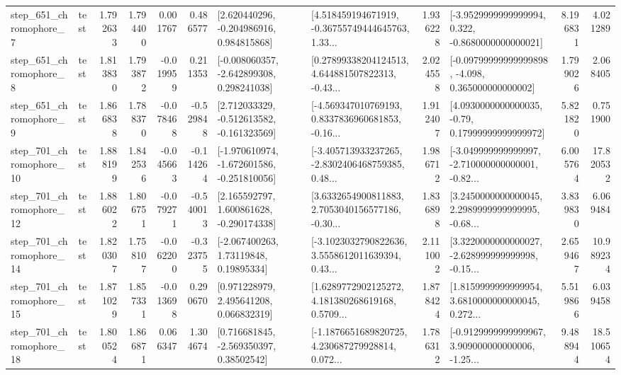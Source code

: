 \begin{tabular}{llrrrrllrlrr}
   step\_651\_chromophore\_7 &      test &      1.792633 &    1.794400 &      0.001767 &  0.486577 &    [2.620440296, -0.204986916, 0.984815868] &  [4.518459194671919, -0.36755749444645763, 1.33... &       1.936228 &  [-3.9529999999999994, 0.322, -0.8680000000000021] &            8.196831 &          4.021289 \\
   step\_651\_chromophore\_8 &      test &      1.813830 &    1.793872 &     -0.019959 &  0.211353 &   [-0.008060357, -2.642899308, 0.298241038] &  [0.27899338204124513, 4.644881507822313, -0.43... &       2.024558 &  [-0.09799999999999898, -4.098, 0.365000000000002] &            1.799026 &          2.068405 \\
   step\_651\_chromophore\_9 &      test &      1.866838 &    1.788370 &     -0.078468 & -0.529848 &   [2.712033329, -0.512613582, -0.161323569] &  [-4.569347010769193, 0.8337836960681853, -0.16... &       1.912407 &   [4.0930000000000035, -0.79, 0.17999999999999972] &            5.821820 &          0.751900 \\
  step\_701\_chromophore\_10 &      test &      1.888199 &    1.842536 &     -0.045663 & -0.114264 &  [-1.970610974, -1.672601586, -0.251810056] &  [-3.405713933237265, -2.8302406468759385, 0.48... &       1.986712 &  [-3.049999999999997, -2.710000000000001, -0.82... &            6.005764 &         17.820532 \\
  step\_701\_chromophore\_12 &      test &      1.886022 &    1.806751 &     -0.079271 & -0.540013 &    [2.165592797, 1.600861628, -0.290174338] &  [3.6332654900811883, 2.7053040156577186, -0.30... &       1.836898 &  [3.2450000000000045, 2.2989999999999995, -0.68... &            3.839830 &          6.069484 \\
  step\_701\_chromophore\_14 &      test &      1.820307 &    1.758107 &     -0.062200 & -0.323755 &      [-2.067400263, 1.73119848, 0.19895334] &  [-3.1023032790822636, 3.5558612011639394, 0.43... &       2.111002 &  [3.3220000000000027, -2.628999999999998, -0.15... &            2.659467 &         10.989234 \\
  step\_701\_chromophore\_15 &      test &      1.871029 &    1.857331 &     -0.013698 &  0.290670 &     [0.971228979, 2.495641208, 0.066832319] &  [1.6289772902125272, 4.181380268619168, 0.5709... &       1.878424 &  [1.8159999999999954, 3.6810000000000045, 0.272... &            5.519866 &          6.039458 \\
  step\_701\_chromophore\_18 &      test &      1.800524 &    1.866871 &      0.066347 &  1.304674 &     [0.716681845, -2.569350397, 0.38502542] &  [-1.1876651689820725, 4.230687279928814, 0.072... &       1.786312 &  [-0.9129999999999967, 3.909000000000006, -1.25... &            9.488944 &         18.510654 \\

\end{tabular}
